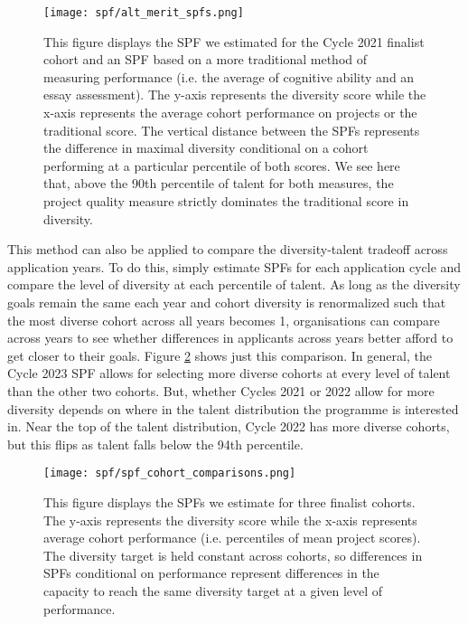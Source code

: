 \begin{figure}[htbp]
    \centering
    \texttt{[image: spf/alt\_merit\_spfs.png]} 
    \caption{This figure displays the SPF we estimated for the Cycle 2021 finalist cohort and an SPF based on a more traditional method of measuring performance (i.e. the average of cognitive ability and an essay assessment). The y-axis represents the diversity score while the x-axis represents the average cohort performance on projects or the traditional score. The vertical distance between the SPFs represents the difference in maximal diversity conditional on a cohort performing at a particular percentile of both scores. We see here that, above the 90th percentile of talent for both measures, the project quality measure strictly dominates the traditional score in diversity.}
    \label{fig:compare_div_tradeoffs}
\end{figure}
        
This method can also be applied to compare the diversity-talent tradeoff across application years. To do this, simply estimate SPFs for each application cycle and compare the level of diversity at each percentile of talent. As long as the diversity goals remain the same each year and cohort diversity is renormalized such that the most diverse cohort across all years becomes 1, organisations can compare across years to see whether differences in applicants across years better afford to get closer to their goals. Figure \ref{fig:diversity_across_cohorts} shows just this comparison. In general, the Cycle 2023 SPF allows for selecting more diverse cohorts at every level of talent than the other two cohorts. But, whether Cycles 2021 or 2022 allow for more diversity depends on where in the talent distribution the programme is interested in. Near the top of the talent distribution, Cycle 2022 has more diverse cohorts, but this flips as talent falls below the 94th percentile.

\begin{figure}[!htb]
    \centering
    \texttt{[image: spf/spf\_cohort\_comparisons.png]} 
    \caption{ This figure displays the SPFs we estimate for three finalist cohorts. The y-axis represents the diversity score while the x-axis represents average cohort performance (i.e. percentiles of mean project scores). The diversity target is held constant across cohorts, so differences in SPFs conditional on performance represent differences in the capacity to reach the same diversity target at a given level of performance.}
    \label{fig:diversity_across_cohorts}
\end{figure}

